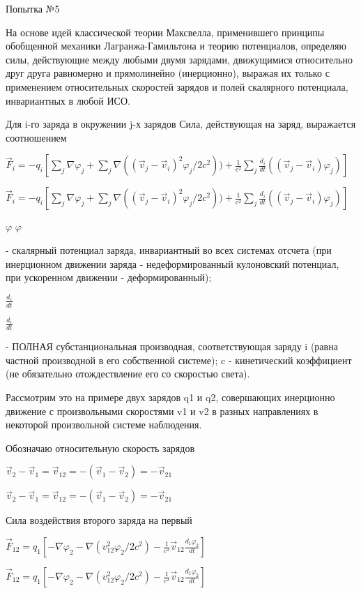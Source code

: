 \documentclass{article}
\begin{document}
			Попытка №5

На основе идей классической теории Максвелла, применившего принципы обобщенной механики Лагранжа-Гамильтона и теорию потенциалов, определяю силы, действующие между любыми двумя зарядами, движущимися относительно друг друга равномерно и прямолинейно (инерционно), выражая их только с применением относительных скоростей зарядов и полей скалярного потенциала, инвариантных в любой ИСО.

Для i-го заряда в окружении j-х зарядов Сила, действующая на заряд, выражается соотношением 

$\vec F_i=-q_i\left [\sum_j\nabla\varphi_j+\sum_j\nabla((\vec v_j-\vec v_i)^2\varphi_j/2c^2))+\frac{1}{c^2}\sum_j\frac{d_i}{dt}((\vec v_j-\vec v_i)\varphi_j)\right ]$

$\vec F_i=-q_i\left [\sum_j\nabla\varphi_j+\sum_j\nabla((\vec v_j-\vec v_i)^2\varphi_j/2c^2))+\frac{1}{c^2}\sum_j\frac{d_i}{dt}((\vec v_j-\vec v_i)\varphi_j)\right ]$

$\varphi$
$\varphi$

 - скалярный потенциал заряда, инвариантный во всех системах отсчета (при инерционном движении заряда - недеформированный кулоновский потенциал, при ускоренном движении - деформированный);

$\frac{d_i}{dt}$

$\frac{d_i}{dt}$

- ПОЛНАЯ субстанциональная производная, соответствующая заряду i (равна частной производной в его собственной системе); c - кинетический коэффициент (не обязательно отождествление его со скоростью света).

Рассмотрим это на примере двух зарядов q1 и q2, совершающих инерционно движение с произвольными скоростями v1 и v2 в разных направлениях в некоторой произвольной системе наблюдения.

Обозначаю относительную скорость зарядов

$\vec v_2-\vec v_1=\vec v_{12}=-(\vec v_1-\vec v_2)=-\vec v_{21}$

$\vec v_2-\vec v_1=\vec v_{12}=-(\vec v_1-\vec v_2)=-\vec v_{21}$

Сила воздействия второго заряда на первый

$\vec F_{12}=q_1\left [-\nabla\varphi_2-\nabla(v_{12}^2\varphi_2/2c^2)-\frac{1}{c^2}\vec v_{12} \frac{d_1\varphi_2}{dt}\right ]$

$\vec F_{12}=q_1\left [-\nabla\varphi_2-\nabla(v_{12}^2\varphi_2/2c^2)-\frac{1}{c^2}\vec v_{12} \frac{d_1\varphi_2}{dt}\right ]$
\end{document}

